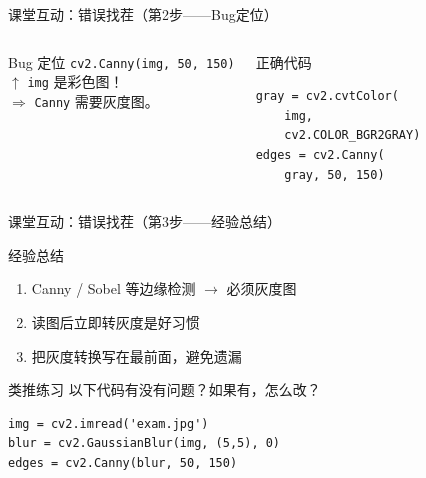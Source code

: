 \begin{frame}[fragile]{课堂互动：错误找茬（第2步——Bug定位）}
    \begin{columns}
        \begin{alertblock}{Bug 定位}
            \texttt{cv2.Canny(img, 50, 150)}\\
            $\uparrow$ \texttt{img} 是彩色图！\\
            $\Rightarrow$ \texttt{Canny} 需要灰度图。
        \end{alertblock}

        \begin{block}{正确代码}
            \begin{lstlisting}[basicstyle=\ttfamily\scriptsize, numbers=none]
gray = cv2.cvtColor(
    img,
    cv2.COLOR_BGR2GRAY)
edges = cv2.Canny(
    gray, 50, 150)
            \end{lstlisting}
        \end{block}
    \end{columns}

\end{frame}

\begin{frame}[fragile]{课堂互动：错误找茬（第3步——经验总结）}
    \begin{block}{经验总结}
        \begin{enumerate}
            \item Canny / Sobel 等边缘检测 $\rightarrow$ 必须灰度图
            \item 读图后立即转灰度是好习惯
            \item 把灰度转换写在最前面，避免遗漏
        \end{enumerate}
    \end{block}

    \pause
    \vspace{0.3cm}

    \begin{uncoverenv}
        \begin{block}{类推练习}
            以下代码有没有问题？如果有，怎么改？
            \begin{verbatim}
img = cv2.imread('exam.jpg')
blur = cv2.GaussianBlur(img, (5,5), 0)
edges = cv2.Canny(blur, 50, 150)
            \end{verbatim}
        \end{block}
    \end{uncoverenv}
\end{frame}

